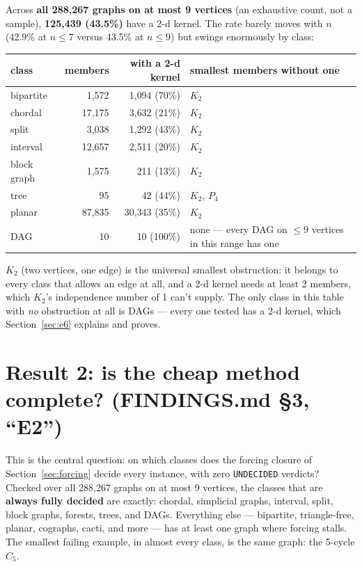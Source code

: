 \documentclass[11pt]{article}
\theoremstyle{plain}
\theoremstyle{definition}
\theoremstyle{remark}
\begin{document}
Across \textbf{all 288{,}267 graphs on at most 9 vertices} (an exhaustive count, not a
sample), \textbf{125{,}439 (43.5\%)} have a 2-d kernel. The rate barely moves with $n$
(42.9\% at $n\le 7$ versus 43.5\% at $n \le 9$) but swings enormously by class:

\begin{center}
\begin{tabular}{@{}lrrl@{}}
\toprule
class & members & with a 2-d kernel & smallest members without one \\
\midrule
bipartite & 1{,}572 & 1{,}094 (70\%) & $K_2$ \\
chordal & 17{,}175 & 3{,}632 (21\%) & $K_2$ \\
split & 3{,}038 & 1{,}292 (43\%) & $K_2$ \\
interval & 12{,}657 & 2{,}511 (20\%) & $K_2$ \\
block graph & 1{,}575 & 211 (13\%) & $K_2$ \\
tree & 95 & 42 (44\%) & $K_2$, $P_4$ \\
planar & 87{,}835 & 30{,}343 (35\%) & $K_2$ \\
DAG & 10 & 10 (100\%) & none --- every DAG on $\le 9$ vertices in this range has one \\
\bottomrule
\end{tabular}
\end{center}

$K_2$ (two vertices, one edge) is the universal smallest obstruction: it belongs to
every class that allows an edge at all, and a 2-d kernel needs at least 2 members, which
$K_2$'s independence number of 1 can't supply. The only class in this table with
\emph{no} obstruction at all is DAGs — every one tested has a 2-d kernel, which
Section~\ref{sec:e6} explains and proves.

\section{Result 2: is the cheap method complete? (FINDINGS.md \S3, ``E2'')}
\label{sec:e2}

This is the central question: on which classes does the forcing closure of
Section~\ref{sec:forcing} decide every instance, with zero \texttt{UNDECIDED}
verdicts? Checked over all 288{,}267 graphs on at most 9 vertices, the classes that are
\textbf{always fully decided} are exactly: chordal, simplicial graphs, interval,
split, block graphs, forests, trees, and DAGs. Everything else — bipartite,
triangle-free, planar, cographs, cacti, and more — has at least one graph where
forcing stalls. The smallest failing example, in almost every class, is the same
graph: the 5-cycle $C_5$.
\end{document}
